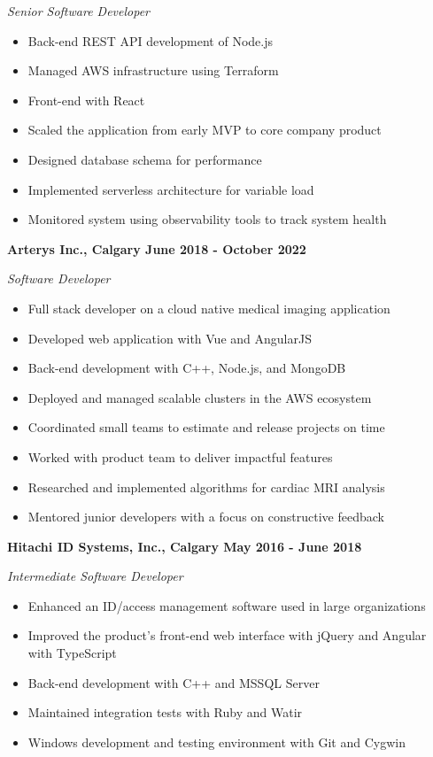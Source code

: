 \documentclass[12pt]{article}
\begin{document}
\indent \emph{ Senior Software Developer }
\begin{itemize}
  \item Back-end REST API development of Node.js
  \item Managed AWS infrastructure using Terraform
  \item Front-end with React
  \item Scaled the application from early MVP to core company product
  \item Designed database schema for performance
  \item Implemented serverless architecture for variable load
  \item Monitored system using observability tools to track system health
\end{itemize}
\medskip

\pagebreak
\noindent \centerline{ \bf Arterys Inc., Calgary \hfill June 2018 - October 2022}
\indent \emph{ Software Developer }
\begin{itemize}
  \item Full stack developer on a cloud native medical imaging application
  \item Developed web application with Vue and AngularJS
  \item Back-end development with C++, Node.js, and MongoDB
  \item Deployed and managed scalable clusters in the AWS ecosystem
  \item Coordinated small teams to estimate and release projects on time
  \item Worked with product team to deliver impactful features
  \item Researched and implemented algorithms for cardiac MRI analysis
  \item Mentored junior developers with a focus on constructive feedback
\end{itemize}
\medskip

\noindent \centerline{ \bf Hitachi ID Systems, Inc., Calgary \hfill May 2016 - June 2018}
\indent \emph{ Intermediate Software Developer }
\begin{itemize}
  \item Enhanced an ID/access management software used in large organizations
  \item Improved the product's front-end web interface with jQuery and Angular with TypeScript
  \item Back-end development with C++ and MSSQL Server
  \item Maintained integration tests with Ruby and Watir
  \item Windows development and testing environment with Git and Cygwin
\end{itemize}
\medskip
\end{document}
